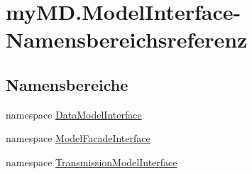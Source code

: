 \hypertarget{namespacemy_m_d_1_1_model_interface}{}\section{my\+M\+D.\+Model\+Interface-\/\+Namensbereichsreferenz}
\label{namespacemy_m_d_1_1_model_interface}
\subsection*{Namensbereiche}
\begin{DoxyCompactItemize}
\item 
namespace \mbox{\hyperlink{namespacemy_m_d_1_1_model_interface_1_1_data_model_interface}{Data\+Model\+Interface}}
\item 
namespace \mbox{\hyperlink{namespacemy_m_d_1_1_model_interface_1_1_model_facade_interface}{Model\+Facade\+Interface}}
\item 
namespace \mbox{\hyperlink{namespacemy_m_d_1_1_model_interface_1_1_transmission_model_interface}{Transmission\+Model\+Interface}}
\end{DoxyCompactItemize}
